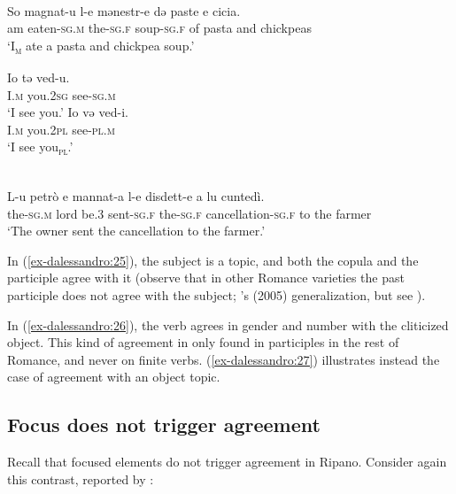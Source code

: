\documentclass[output=paper
,modfonts
,nonflat]{langsci/langscibook}
\begin{document}
\begin{exe}
	\ex\label{ex-dalessandro:25} \citet[71]{Rossi2008}\\
	\gll So   magnat-u   l-e     mənestr-e   də paste e cicia.\\
	am  eaten-\textsc{sg.m}  the-\textsc{sg.f} soup-\textsc{sg.f} of pasta and chickpeas\\ 
	\glt `I\textsc{\textsubscript{m}} ate a pasta and chickpea soup.'
\end{exe}
\begin{exe}
	\ex\label{ex-dalessandro:26} \citet[394]{Harder1998} \xlist
	\ex
	\gll  Io   tə     ved-u.\\
	I.\textsc{m}  you.2\textsc{sg}  see-\textsc{sg.m}\\ 
	\glt `I see you.'
	\ex
	\gll Io   və     ved-i.\\
	I\textsc{.m} you.2\textsc{pl} see-\textsc{pl.m}\\ 
	\glt `I see you\textsc{\textsubscript{pl}}.'
	\endxlist
\end{exe}
\begin{exe}
	\ex \label{ex-dalessandro:27}\citet[93]{Rossi2008}\\
	\gll L-u     petrò e   mannat-a l-e   disdett-e     a lu cuntedì.\\
	the-\textsc{sg.m}  lord  be.3  sent-\textsc{sg.f} the-\textsc{sg.f} cancellation-\textsc{sg.f} to the farmer\\ 
	\glt `The owner sent the cancellation to the farmer.'
\end{exe}
In (\ref{ex-dalessandro:25}), the subject is a topic, and both the copula and the participle agree with it (observe that in other Romance varieties the past participle does not agree with the subject; \citeauthor{Belletti2005}'s (2005) generalization, but see \citealt{D`Alessandro_Roberts2010}).

In (\ref{ex-dalessandro:26}), the verb agrees in gender and number with the cliticized object. This kind of agreement in only found in participles in the rest of Romance, and never on finite verbs. (\ref{ex-dalessandro:27}) illustrates instead the case of agreement with an object topic. 

\subsection{Focus does not trigger agreement} \label{sec-dalessandro:4.3}
Recall that focused elements do not trigger agreement in Ripano. Consider again this contrast, reported by \citet{Paciaroni2017}:
\end{document}
